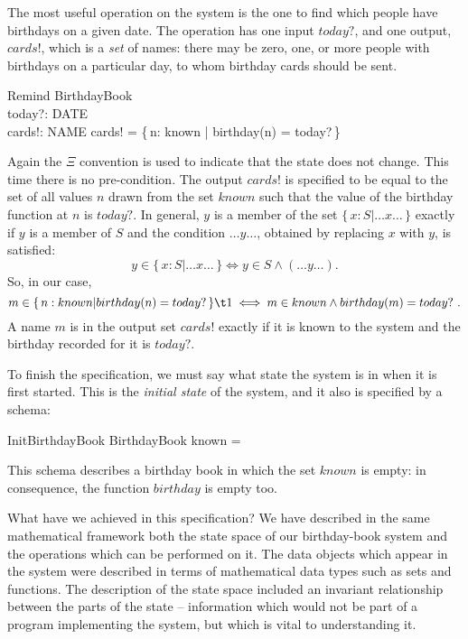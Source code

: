 The most useful operation on the system is the one to find
which people have birthdays on a given date.  The operation has one
input $today?$, and one output, $cards!$, which is a {\em set\/} of names:
there may be zero, one, or more people with birthdays on a
particular day, to whom birthday cards should be sent.
\begin{schema}{Remind}
	\Xi BirthdayBook \\
	today?: DATE \\
	cards!: \power NAME
\where
	cards! = \{\,n: known | birthday(n) = today?\,\}
\end{schema}
Again the $\Xi$ convention is used to indicate that the
state does not change. This time there is no pre-condition.
The output $cards!$ is specified to be equal to the set of
all values $n$ drawn from the set $known$ such that the
value of the birthday function at $n$ is $today?$. In general,
$y$ is a member of the set $\{\,x:S | \ldots x \ldots\,\}$
exactly if $y$ is a member of $S$ and the condition $\ldots
y \ldots$, obtained by replacing $x$ with $y$, is satisfied:
\[ y \in \{\,x: S | \ldots x \ldots \,\}
	\iff y \in S \land (\ldots y \ldots). \]
So, in our case,
\[ m \in \{\,n: known | birthday(n) = today?\,\} \\
\t1 		\iff m \in known \land birthday(m) = today?~. \]
A name $m$ is in the output set $cards!$ exactly if it is
known to the system and the birthday recorded for it is
$today?$.

To finish the specification, we must say what state the system is in
when it is first started. This is the {\em initial state\/} of the
system, and it also is specified by a schema:
\begin{schema}{InitBirthdayBook}
	BirthdayBook
\where
	known = \empty
\end{schema}
This schema describes a birthday book in which the set $known$ is
empty: in consequence, the function $birthday$ is empty too.

What have we achieved in this specification? We have described in the
same mathematical framework both the state space of our birthday-book
system and the operations which can be performed on it.  The data
objects which appear in the system were described in terms of
mathematical data types such as sets and functions. The description of
the state space included an invariant relationship between the parts of
the state -- information which would not be part of a program
implementing the system, but which is vital to understanding it.

